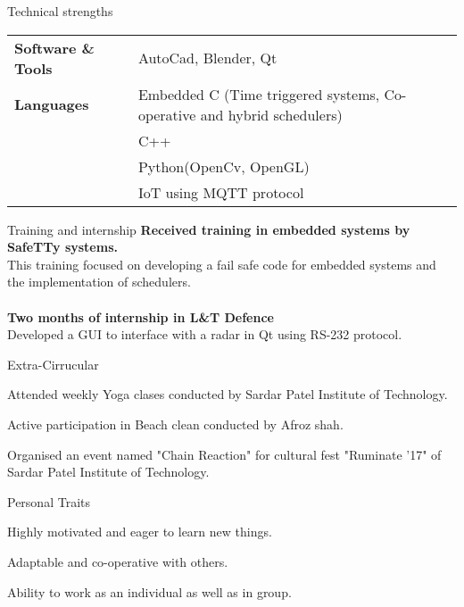 \documentclass{resume} %
\begin{document}
\begin{rSection}{Technical strengths}
\begin{tabular}{ @{} >{\bfseries}l @{\hspace{6ex}} l }
Software \& Tools \ & AutoCad, Blender, Qt \\
Languages & Embedded C (Time triggered systems, Co-operative and hybrid schedulers)\\ & C++\\ & Python(OpenCv, OpenGL) \\ & IoT using MQTT protocol \\
\end{tabular}
\end{rSection}

\begin{rSection}{Training and internship}
{\bf Received training in embedded systems by SafeTTy systems.}
\\This training focused on developing a fail safe code for embedded systems and the implementation of schedulers.\\
\\{\bf Two months of internship in L\&T Defence}
\\Developed a GUI to interface with a radar in Qt using RS-232 protocol.
\end{rSection}

\newpage
\begin{rSection}{Extra-Cirrucular} \itemsep -3pt
\item Attended weekly Yoga clases conducted by Sardar Patel Institute of Technology.
\item Active participation in Beach clean conducted by Afroz shah.
\item Organised an event named "Chain Reaction" for cultural fest "Ruminate '17" of Sardar Patel Institute of Technology.
\end{rSection}

\begin{rSection}{Personal Traits}
\item Highly motivated and eager to learn new things.
\item Adaptable and co-operative with others.
\item Ability to work as an individual as well as in group.
\end{rSection}
\end{document}
